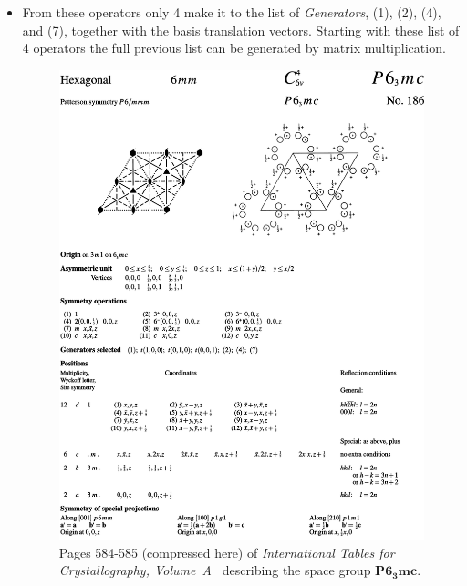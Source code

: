 \begin{itemize}
 \item From these operators only 4 make it to the list of \textit{Generators}, (1), (2), (4), and (7), together with the basis translation vectors. Starting with these list of 4 operators the full previous list can be generated by matrix multiplication.
 
\begin{figure}
    \centering
\includegraphics[width=1.\linewidth]{Figures/ITC.png}
\caption[Space group $\mathbf{P6_3mc}$ in \textit{ITC}]{ Pages 584-585 (compressed here) of \textit{International Tables for Crystallography, Volume~A}~\cite{IntTableCrysA} describing the space group $\mathbf{P6_3mc}$. }
\label{Fig:ITC}
\end{figure}


\end{itemize}
